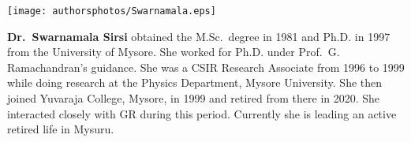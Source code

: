 \centerline{\texttt{[image: authorsphotos/Swarnamala.eps]}}
\smallskip

\bigskip

\noindent
\textbf{Dr.\ Swarnamala Sirsi} obtained the M.Sc.\ degree in 1981 and Ph.D. in 1997 from the University of Mysore. She worked for Ph.D. under Prof.\ G. Ramachandran’s guidance. She was a CSIR Research Associate from 1996 to 1999 while doing research at the Physics Department, Mysore University. She then joined Yuvaraja College, Mysore, in 1999 and retired from there in 2020. She interacted closely with GR during this period. Currently she is leading an active retired life in Mysuru.
